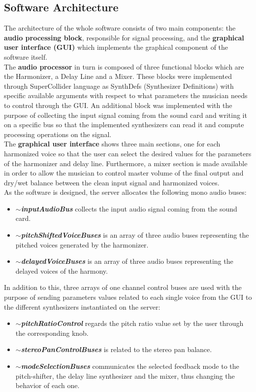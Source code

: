 \documentclass{article}
\begin{document}
\subsection{Software Architecture}
The architecture of the whole software consists of two main components: the \textbf{audio processing block}, responsible for signal processing, and the \textbf{graphical user interface (GUI)} which implements the graphical component of the software itself.
\\The \textbf{audio processor} in turn is composed of three functional blocks which are the Harmonizer, a Delay Line and a Mixer. These blocks were implemented through SuperCollider language as SynthDefs (Synthesizer Definitions) with specific available arguments with respect to what parameters the musician needs to control through the GUI. An additional block was implemented with the purpose of collecting the input signal coming from the sound card and writing it on a specific bus so that the implemented synthesizers can read it and compute processing operations on the signal.
\\The \textbf{graphical user interface} shows three main sections, one for each harmonized voice so that the user can select the desired values for the parameters of the harmonizer and delay line. Furthermore, a mixer section is made available in order to allow the musician to control master volume of the final output and dry/wet balance between the clean input signal and harmonized voices.
\\As the software is designed, the server allocates the following mono audio buses:

 \begin{itemize}
  \item \textbf{\textit{$\sim$inputAudioBus}} collects the input audio signal coming from the sound card.
  \item \textbf{\textit{$\sim$pitchShiftedVoiceBuses}} is an array of three audio buses representing the pitched voices generated by the harmonizer.
  \item \textbf{\textit{$\sim$delayedVoiceBuses}} is an array of three audio buses representing the delayed voices of the harmony.
\end{itemize}
In addition to this, three arrays of one channel control buses are used with the purpose of sending parameters values related to each single voice from the GUI to the different synthesizers instantiated on the server:

 \begin{itemize}
  \item \textbf{\textit{$\sim$pitchRatioControl}} regards the pitch ratio value set by the user through the corresponding knob.
  \item \textbf{\textit{$\sim$stereoPanControlBuses}} is related to the stereo pan balance.
  \item \textbf{\textit{$\sim$modeSelectionBuses}} communicates the selected feedback mode to the pitch-shifter, the delay line synthesizer and the mixer, thus changing the behavior of each one.
\end{itemize}
\end{document}
